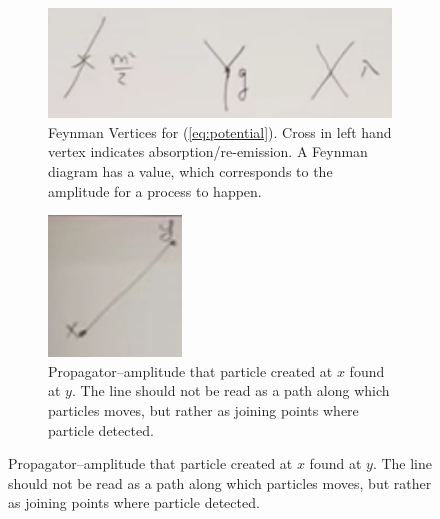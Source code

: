 \documentclass[]{article}
\begin{document}
\begin{figure}[H]
	\begin{center}
		\caption{Elements of a Feynman diagram}
		\begin{subfigure}[t]{0.45\textwidth}
			\caption{Feynman Vertices for (\ref{eq:potential}). Cross in left hand vertex indicates absorption/re-emission. A Feynman diagram has a value, which corresponds to the amplitude for a process to happen.}\label{fig:3-1-feynman-vertices}
			\includegraphics[width=\textwidth]{3-1-feynman-vertices}
		\end{subfigure}
		\begin{subfigure}[t]{0.45\textwidth}
			\caption{Propagator--amplitude that particle created at $x$ found at $y$. The line should not be read as a path along which particles moves, but rather as joining points where particle detected.}\label{fig:3-1-feynman-propagator}
			\includegraphics[width=\textwidth]{3-1-feynman-propagator}
		\end{subfigure}
	\end{center}
\end{figure}
\end{document}

